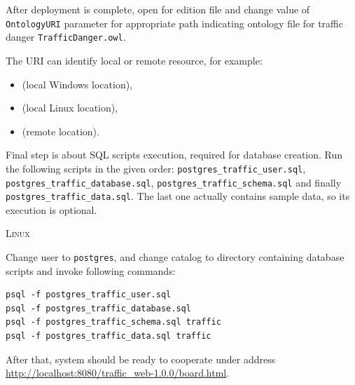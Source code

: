 \bigskip

After deployment is complete, open for edition  file and change value of \texttt{OntologyURI} parameter for appropriate path indicating ontology file for traffic danger \texttt{TrafficDanger.owl}. 

\bigskip

The URI can identify local or remote resource, for example:
\begin{itemize}
    \setlength{\itemsep}{0cm}
    \setlength{\parskip}{0cm}

    \item {} (local Windows location),
    \item {} (local Linux location),
    \item {} (remote location).
\end{itemize}

\smallskip

Final step is about SQL scripts execution, required for database creation. Run the following scripts in the given order: \texttt{postgres\_traffic\_user.sql}, \texttt{postgres\_traffic\_database.sql}, \texttt{postgres\_traffic\_schema.sql} and finally \texttt{postgres\_traffic\_data.sql}. The last one actually contains sample data, so its execution is optional.

\newpage

{\scshape Linux}
\smallskip

Change user to \texttt{postgres}, and change catalog to directory containing database scripts and invoke following commands:

\begin{verbatim}
psql -f postgres_traffic_user.sql
psql -f postgres_traffic_database.sql
psql -f postgres_traffic_schema.sql traffic
psql -f postgres_traffic_data.sql traffic
\end{verbatim}

After that, system should be ready to cooperate under address \url{http://localhost:8080/traffic_web-1.0.0/board.html}.
